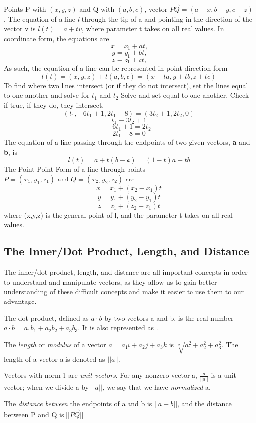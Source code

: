 \documentclass[12pt, letterpaper]{article}
\begin{document}
Points P with \((x, y, z)\) and Q with \((a, b, c)\), vector \(\overrightarrow{PQ} = (a - x, b - y, c - z)\). The equation of a line \textit{l} through the tip of a and pointing in the direction of the vector v is \(l(t) = a + tv\), where parameter t takes on all real values. In coordinate form, the equations are
\[x = x_{1} + at\text{,}\] \[y=y_{1} + bt\text{,}\] \[z=z_{1} + ct\text{,}\]
As such, the equation of a line can be represented in point-direction form \[l(t) = (x, y, z) + t(a, b, c) = (x + ta, y + tb, z + tc)\]
To find where two lines intersect (or if they do not intersect), set the lines equal to one another and solve for \(t_{1}\) and \(t_{2}\)
Solve and set equal to one another. Check if true, if they do, they intersect.
\[(t_{1}, - 6t_{1} + 1, 2t_{1} - 8) = (3t_{2} + 1, 2t_{2}, 0) \]
\[t_{1} = 3t_{2} + 1\]
\[-6t_{1} + 1 = 2t_{2}\]
\[2t_{1} - 8 = 0\]
The equation of a line passing through the endpoints of two given vectors, \textbf{a} and \textbf{b}, is 
\[l(t) = a + t(b - a) = (1 - t)a + tb \]
The Point-Point Form of a line through points \(P = (x_{1}, y_{1}, z_{1}) \text{ and } Q = (x_2, y_2, z_2)\) are
\[x = x_1 + (x_2 - x_1)t\]
\[y = y_1 + (y_2 - y_1)t\]
\[z = z_1 + (z_2 - z_1)t\]
where (x,y,z) is the general point of l, and the parameter t takes on all real values.

\subsection{The Inner/Dot Product, Length, and Distance}

The inner/dot product, length, and distance are all important concepts in order to understand and manipulate vectors, as they allow us to gain better understanding of these difficult concepts and make it easier to use them to our advantage.

The dot product, defined as \(a \cdot b\) by two vectors a and b, is the real number \(a \cdot b = a_1b_1 + a_2b_2 + a_3b_3\). It is also represented as \(<a, b>\).

The \textit{length} or \textit{modulus} of a vector \(a = a_1i + a_2j + a_3k\) is \(\sqrt[2]{a_{1}^{2} + a_{2}^{2} + a_{3}^{2}}\). The length of a vector a is denoted as \(||a||\).

Vectors with norm 1 are \textit{unit vectors}. For any nonzero vector a, \(\frac{a}{||a||}\) is a unit vector; when we divide a by \(||a||\), we say that we have \textit{normalized} a.

The \textit{distance between} the endpoints of a and b is \(||a - b||\), and the distance between P and Q is \(||\overrightarrow{PQ}||\)
\end{document}
